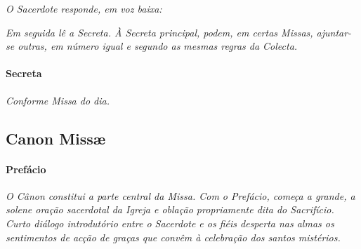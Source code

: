 \textit{O Sacerdote responde, em voz baixa:}

\begin{paracol}{2}\switchcolumn{}\end{paracol}

\textit{Em seguida lê a Secreta. À Secreta principal, podem, em certas Missas, ajuntar-se outras, em número igual e segundo as mesmas regras da Colecta.}

\paragraph{Secreta}

\emph{Conforme Missa do dia.}

\begin{paracol}{2}\switchcolumn{}\switchcolumn*{}\switchcolumn{}\end{paracol}

\subsection{Canon Missæ}

\paragraph{Prefácio}

\textit{O Cânon constitui a parte central da Missa. Com o Prefácio, começa a grande, a solene oração sacerdotal da Igreja e oblação propriamente dita do Sacrifício. Curto diálogo introdutório entre o Sacerdote e os fiéis desperta nas almas os sentimentos de acção de graças que convêm à celebração dos santos mistérios.}

\begin{paracol}{2}\switchcolumn{}\switchcolumn*{}\switchcolumn{}\switchcolumn*{}\switchcolumn{}\switchcolumn*{}\switchcolumn{}\switchcolumn*{}\switchcolumn{}\switchcolumn*{}\switchcolumn{}\end{paracol}

